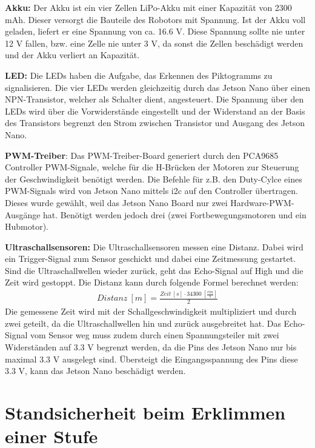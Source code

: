 \textbf{Akku:} Der Akku ist ein vier Zellen LiPo-Akku mit einer Kapazität von 2300 mAh. Dieser versorgt die Bauteile des Robotors mit Spannung. Ist der Akku voll geladen, liefert er eine Spannung von ca. 16.6 V. Diese Spannung sollte nie unter 12 V fallen, bzw. eine Zelle nie unter 3 V, da sonst die Zellen beschädigt werden und der Akku verliert an Kapazität.

\textbf{LED:} Die LEDs haben die Aufgabe, das Erkennen des Piktogramms zu signalisieren. Die vier LEDs werden gleichzeitig durch das Jetson Nano über einen NPN-Transistor, welcher als Schalter dient, angesteuert. Die Spannung über den LEDs wird über die Vorwiderstände eingestellt und der Widerstand an der Basis des Transistors begrenzt den Strom zwischen Transistor und Ausgang des Jetson Nano.

\textbf{PWM-Treiber}: Das PWM-Treiber-Board generiert durch den PCA9685 Controller PWM-Signale, welche für die H-Brücken der Motoren zur Steuerung der Geschwindigkeit benötigt werden. Die Befehle für z.B. den Duty-Cylce eines PWM-Signals wird von Jetson Nano mittels \acrshort{i2c} auf den Controller übertragen. Dieses wurde gewählt, weil das Jetson Nano Board nur zwei Hardware-PWM-Ausgänge hat. Benötigt werden jedoch drei (zwei Fortbewegungsmotoren und ein Hubmotor).

\textbf{Ultraschallsensoren:} Die Ultraschallsensoren messen eine Distanz. Dabei wird ein Trigger-Signal zum Sensor geschickt und dabei eine Zeitmessung gestartet. Sind die Ultraschallwellen wieder zurück, geht das Echo-Signal auf High und die Zeit wird gestoppt. Die Distanz kann durch folgende Formel berechnet werden:
\begin{align}
    Distanz\ [m] = \frac{Zeit\ [s] \cdot 34300\ [\frac{cm}{s}]}{2}
\end{align}
Die gemessene Zeit wird mit der Schallgeschwindigkeit multipliziert und durch zwei geteilt, da die Ultraschallwellen hin und zurück ausgebreitet hat. 
Das Echo-Signal vom Sensor weg muss zudem durch einen Spannungsteiler mit zwei Widerständen auf 3.3 V begrenzt werden, da die Pins des Jetson Nano nur bis maximal 3.3 V ausgelegt sind. Übersteigt die Eingangsspannung des Pins diese 3.3 V, kann das Jetson Nano beschädigt werden.



\newpage

\section{Standsicherheit beim Erklimmen einer Stufe}

